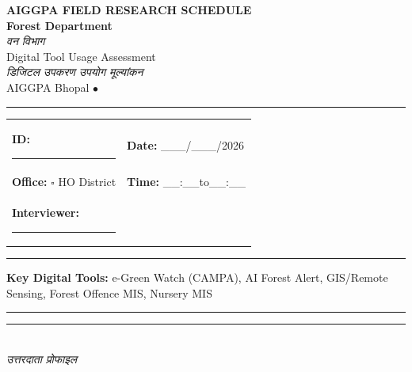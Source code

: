 \documentclass[10pt,a4paper]{article}
\newcommand{\blank}{\rule{7cm}{0.4pt}}
\begin{document}
\begin{center}
{\Large\bfseries AIGGPA FIELD RESEARCH SCHEDULE}\\[1pt]
{\large\bfseries Forest Department}\\[1pt]
{\hindifont\itshape\color{black!70} वन विभाग}\\[4pt]
{\small Digital Tool Usage Assessment}\\[1pt]
{\small\hindifont\itshape\color{black!70} डिजिटल उपकरण उपयोग मूल्यांकन}\\[3pt]
{\small AIGGPA Bhopal \quad$\bullet$}
\end{center}
\vspace{4pt}\noindent\rule{\textwidth}{1pt}\vspace{4pt}
\noindent\begin{tabularx}{\textwidth}{@{}L{9.5cm} X@{}}
\textbf{ID:} \blank & \textbf{Date:} \_\_\_/\_\_\_/2026 \\[4pt]
\textbf{Office:} {\Large$\square$} HO\quad{\Large$\square$} District & \textbf{Time:} \_\_:\_\_\quad to\quad\_\_:\_\_ \\[4pt]
\textbf{Interviewer:} \blank & \\
\end{tabularx}
\vspace{4pt}\noindent\rule{\textwidth}{0.5pt}\vspace{4pt}
\noindent\textbf{Key Digital Tools:} e-Green Watch (CAMPA), AI Forest Alert, GIS/Remote Sensing, Forest Offence MIS, Nursery MIS
\vspace{3pt}\noindent\rule{\textwidth}{0.5pt}
\noindent\rule{\textwidth}{0.3pt}\vspace{3pt}
\\
{\hindifont\itshape\color{black!70} उत्तरदाता प्रोफाइल}\vspace{3pt}
\end{document}
